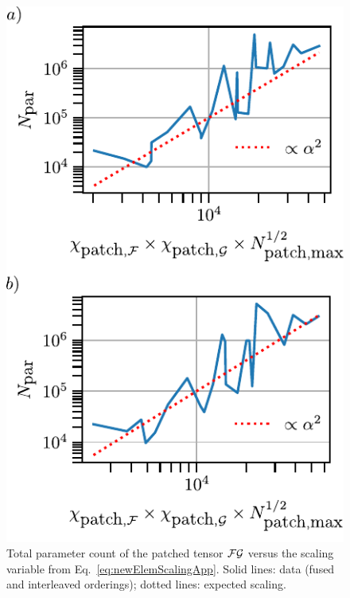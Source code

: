 \begin{figure}[htpb]
    \centering
    \includegraphics{figures/elemMulMemoryScaling.pdf}
    \caption{Total parameter count of the patched tensor \(\mathcal{F}\mathcal{G}\) versus the scaling variable from Eq.~\eqref{eq:newElemScalingApp}.  Solid lines: data (fused and interleaved orderings); dotted lines: expected scaling.}
    \label{fig:elemMulMemoryScaling}
\end{figure}



